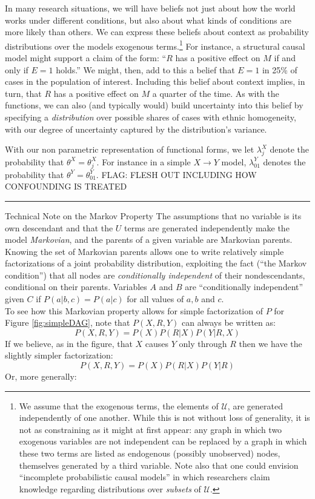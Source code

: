 \documentclass[12pt,]{book}
\let\rmarkdownfootnote\footnote%
\def\footnote{\protect\rmarkdownfootnote}
\begin{document}
In many research situations, we will have beliefs not just about how the world works under different conditions, but also about what kinds of conditions are more likely than others. We can express these beliefs about context as probability distributions over the models exogenous terms.\footnote{We assume that the exogenous terms, the elements of \(\mathcal{U}\), are generated independently of one another. While this is not without loss of generality, it is not as constraining as it might at first appear: any graph in which two exogenous variables are not independent can be replaced by a graph in which these two terms are listed as endogenous (possibly unobserved) nodes, themselves generated by a third variable. Note also that one could envision ``incomplete probabilistic causal models'' in which researchers claim knowledge regarding distributions over \emph{subsets} of \(\mathcal{U}\).} For instance, a structural causal model might support a claim of the form: ``\(R\) has a positive effect on \(M\) if and only if \(E=1\) holds.'' We might, then, add to this a belief that \(E=1\) in 25\% of cases in the population of interest. Including this belief about context implies, in turn, that \(R\) has a positive effect on \(M\) a quarter of the time. As with the functions, we can also (and typically would) build uncertainty into this belief by specifying a \emph{distribution} over possible shares of cases with ethnic homogeneity, with our degree of uncertainty captured by the distribution's variance.

With our non parametric representation of functional forms, we let \(\lambda_j^X\) denote the probability that \(\theta^X = \theta^X_j\). For instance in a simple \(X \rightarrow Y\) model, \(\lambda^Y_{01}\) denotes the probability that \(\theta^Y = \theta^Y_{01}\). FLAG: FLESH OUT INCLUDING HOW CONFOUNDING IS TREATED

\begin{center}\rule{0.5\linewidth}{\linethickness}\end{center}

Technical Note on the Markov Property
The assumptions that no variable is its own descendant and that the \(U\) terms are generated independently make the model \emph{Markovian}, and the parents of a given variable are Markovian parents. Knowing the set of Markovian parents allows one to write relatively simple factorizations of a joint probability distribution, exploiting the fact (``the Markov condition'') that all nodes are \emph{conditionally independent} of their nondescendants, conditional on their parents. Variables \(A\) and \(B\) are ``conditionally independent'' given \(C\) if \(P(a|b,c) = P(a|c)\) for all values of \(a, b\) and \(c\).\\
To see how this Markovian property allows for simple factorization of \(P\) for Figure \ref{fig:simpleDAG}, note that \(P(X, R, Y)\) can always be written as:
\[P(X, R, Y) = P(X)P(R|X)P(Y|R, X)\]
If we believe, as in the figure, that \(X\) causes \(Y\) only through \(R\) then we have the slightly simpler factorization:
\[P(X, R, Y) = P(X)P(R|X)P(Y|R)\]
Or, more generally:
\end{document}
